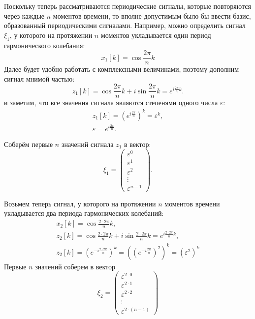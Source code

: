 Поскольку теперь рассматриваются периодические сигналы, которые повторяются через каждые $n$ моментов времени, то вполне допустимым было бы ввести базис, образованный периодическими
сигналами. Например, можно определить сигнал $\xi_1$, у которого на протяжении $n$ моментов укладывается один период гармонического колебания:
\[
    x_1[k]
    = \cos \frac{2 \pi}{n} k
\]
Далее будет удобно работать с комплексными величинами, поэтому дополним сигнал мнимой частью:
\[
    z_1[k]
    = \cos \frac{2 \pi}{n} k + i \sin \frac{2 \pi}{n} k
    = e^{i \frac{2 \pi}{n} k} .
\]
и заметим, что все значения сигнала являются степенями одного числа $\varepsilon$:
\begin{gather*}
    z_1[k]
    = \left( e^{i \frac{2 \pi}{n}} \right)^k
    = \varepsilon^k, \\
    \varepsilon = e^{i \frac{2 \pi}{n}} .
\end{gather*}

Соберём первые $n$ значений сигнала $z_1$ в вектор:
\[
    \xi_1
    = \begin{pmatrix}
          \varepsilon^0 \\
          \varepsilon^1 \\
          \varepsilon^2 \\
          \vdots        \\
          \varepsilon^{n-1}
    \end{pmatrix} .
\]

Возьмем теперь сигнал, у которого на протяжении $n$ моментов времени укладывается два периода гармонических колебаний:
\begin{gather*}
    x_2[k]
    = \cos \frac{2 \cdot 2 \pi}{n} k , \\
    z_2[k]
    = \cos \frac{2 \cdot 2 \pi}{n} k + i \sin \frac{2 \cdot 2 \pi}{n} k
    = e^{i \frac{2 \cdot 2 \pi}{n} k}, \\
    z_2[k]
    = \left( e^{- i \frac{2 \cdot 2 \pi}{n}} \right)^k
    = \left( \left( e^{- i \frac{2 \pi}{n}} \right)^2 \right)^k
    = \left( \varepsilon^2 \right)^k
\end{gather*}
Первые $n$ значений соберем в вектор
\[
    \xi_2
    = \begin{pmatrix}
          \varepsilon^{2 \cdot 0} \\
          \varepsilon^{2 \cdot 1} \\
          \varepsilon^{2 \cdot 2} \\
          \vdots                  \\
          \varepsilon^{2 \cdot (n-1)}
    \end{pmatrix}
\]

